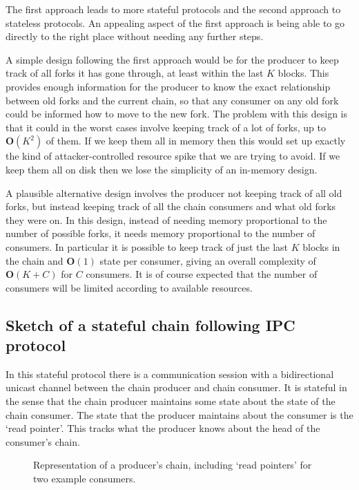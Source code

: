 \documentclass{article}
\theoremstyle{definition}{
  \newtheorem{lemma}{Lemma}[section] %
  \newtheorem{definition}[lemma]{Definition}
}
\theoremstyle{theorem}{
  \newtheorem{invariant}[lemma]{Invariant}
  \newtheorem{proofobligation}[lemma]{Proof Obligation}
}
\numberwithin{equation}{lemma}
\begin{document}
The first approach leads to more stateful protocols and the second approach to
stateless protocols. An appealing aspect of the first approach is being able to
go directly to the right place without needing any further steps.

A simple design following the first approach would be for the producer to keep
track of all forks it has gone through, at least within the last $K$ blocks.
This provides enough information for the producer to know the exact relationship
between old forks and the current chain, so that any consumer on any old fork
could be informed how to move to the new fork. The problem with this design is
that it could in the worst cases involve keeping track of a lot of forks, up to
$\mathbf{O}(K^2)$ of them. If we keep them all in memory then this would set up
exactly the kind of attacker-controlled resource spike that we are trying to
avoid. If we keep them all on disk then we lose the simplicity of an in-memory
design.

A plausible alternative design involves the producer not keeping track of all
old forks, but instead keeping track of all the chain consumers and what old
forks they were on. In this design, instead of needing memory proportional to
the number of possible forks, it needs memory proportional to the number of
consumers. In particular it is possible to keep track of just the last $K$
blocks in the chain and $\mathbf{O}(1)$ state per consumer, giving an overall
complexity of $\mathbf{O}(K + C)$ for $C$ consumers. It is of course expected
that the number of consumers will be limited according to available resources.

\subsection{Sketch of a stateful chain following IPC protocol}

In this stateful protocol there is a communication session with a bidirectional
unicast channel between the chain producer and chain consumer. It is stateful
in the sense that the chain producer maintains some state about the state of
the chain consumer. The state that the producer maintains about the consumer
is the `read pointer'. This tracks what the producer knows about the head of
the consumer's chain.

\begin{figure}
\begin{center}
\end{center}
\caption{Representation of a producer's chain, including `read pointers' for two example consumers.}
\label{chain-diagram-read-pointers}
\end{figure}
\end{document}
